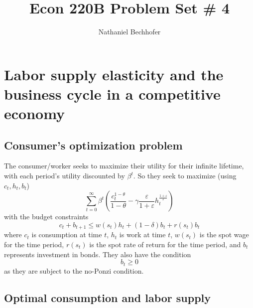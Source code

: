 \documentclass[11pt]{amsart}
\title{Econ 220B Problem Set \# 4}
\author{Nathaniel Bechhofer}
\begin{document}
	


	
\maketitle

\section{Labor supply elasticity and the business cycle in a competitive economy}

\subsection{Consumer's optimization problem}
The consumer/worker seeks to maximize their utility for their infinite lifetime, with each period's utility discounted by $\beta^t$. So they seek to maximize (using $c_t, h_t, b_t$) 
\[
\sum_{t = 0}^{\infty} \beta^t \left( \frac{c_t^{1-\theta}}{1-\theta}  - \gamma \frac{\varepsilon}{1+\varepsilon} h_t^{\frac{1+\varepsilon}{\varepsilon}} \right)
\]
with the budget constraints
\[
c_t + b_{t+1} \leq w(s_t) h_t + (1-\delta) b_{t} + r(s_t) b_{t}
\]
where $c_t$ is consumption at time $t$, $h_t$ is work at time $t$, $w(s_t)$ is the spot wage for the time period, $r(s_t)$ is the spot rate of return for the time period, and $b_t$ represents investment in bonds. They also have the condition 
\[
b_t \geq 0
\]
as they are subject to the no-Ponzi condition.


\subsection{Optimal consumption and labor supply}
\end{document}

